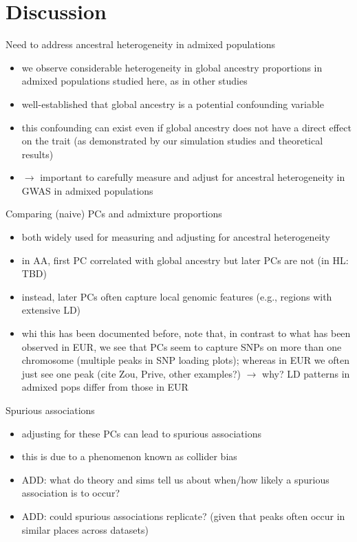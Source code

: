\documentclass[12pt]{article}
\begin{document}
\section{Discussion}


Need to address ancestral heterogeneity in admixed populations
\begin{itemize}
\item we observe considerable heterogeneity in global ancestry proportions in admixed populations studied here, as in other studies 
\item well-established that global ancestry is a potential confounding variable
\item this confounding can exist even if global ancestry does not have a direct effect on the trait (as demonstrated by our simulation studies and theoretical results)
\item $\rightarrow$ important to carefully measure and adjust for ancestral heterogeneity in GWAS in admixed populations
\end{itemize}

\noindent Comparing (naive) PCs and admixture proportions
\begin{itemize}
\item both widely used for measuring and adjusting for ancestral heterogeneity
\item in AA, first PC correlated with global ancestry but later PCs are not (in HL: TBD)
\item instead, later PCs often capture local genomic features (e.g., regions with extensive LD)
\item whi this has been documented before, note that, in contrast to what has been observed in EUR, we see that PCs seem to capture SNPs on more than one chromosome (multiple peaks in SNP loading plots); whereas in EUR we often just see one peak (cite Zou, Prive, other examples?) $\rightarrow$ why? LD patterns in admixed pops differ from those in EUR
\end{itemize}

\noindent Spurious associations
\begin{itemize}
\item adjusting for these PCs can lead to spurious associations
\item this is due to a phenomenon known as collider bias
\item ADD: what do theory and sims tell us about when/how likely a spurious association is to occur?
\item ADD: could spurious associations replicate? (given that peaks often occur in similar places across datasets)
\end{itemize}
\end{document}
